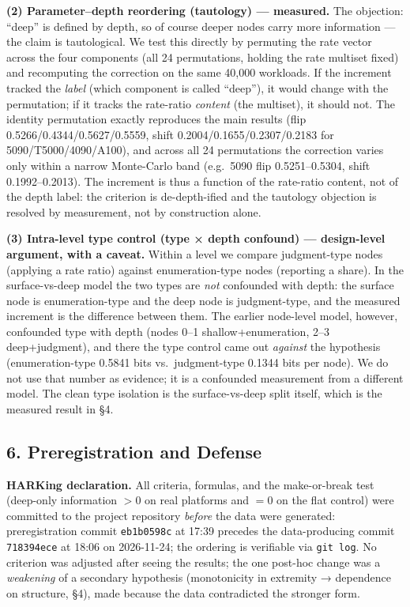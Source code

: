 {{{{\textbf{(2) Parameter--depth reordering (tautology) --- measured.} The objection: ``deep'' is defined by depth, so of course deeper nodes carry more information --- the claim is tautological. We test this directly by permuting the rate vector across the four components (all 24 permutations, holding the rate multiset fixed) and recomputing the correction on the same 40,000 workloads. If the increment tracked the \emph{label} (which component is called ``deep''), it would change with the permutation; if it tracks the rate-ratio \emph{content} (the multiset), it should not. The identity permutation exactly reproduces the main results (flip 0.5266/0.4344/0.5627/0.5559, shift 0.2004/0.1655/0.2307/0.2183 for 5090/T5000/4090/A100), and across all 24 permutations the correction varies only within a narrow Monte-Carlo band (e.g.~5090 flip 0.5251--0.5304, shift 0.1992--0.2013). The increment is thus a function of the rate-ratio content, not of the depth label: the criterion is de-depth-ified and the tautology objection is resolved by measurement, not by construction alone.

\textbf{(3) Intra-level type control (type × depth confound) --- design-level argument, with a caveat.} Within a level we compare judgment-type nodes (applying a rate ratio) against enumeration-type nodes (reporting a share). In the surface-vs-deep model the two types are \emph{not} confounded with depth: the surface node is enumeration-type and the deep node is judgment-type, and the measured increment is the difference between them. The earlier node-level model, however, confounded type with depth (nodes 0--1 shallow+enumeration, 2--3 deep+judgment), and there the type control came out \emph{against} the hypothesis (enumeration-type 0.5841 bits vs.~judgment-type 0.1344 bits per node). We do not use that number as evidence; it is a confounded measurement from a different model. The clean type isolation is the surface-vs-deep split itself, which is the measured result in §4.

\subsection{6. Preregistration and Defense}\label{preregistration-and-defense}

\textbf{HARKing declaration.} All criteria, formulas, and the make-or-break test (deep-only information \(> 0\) on real platforms and \(= 0\) on the flat control) were committed to the project repository \emph{before} the data were generated: preregistration commit \texttt{eb1b0598c} at 17:39 precedes the data-producing commit \texttt{718394ece} at 18:06 on 2026-11-24; the ordering is verifiable via \texttt{git\ log}. No criterion was adjusted after seeing the results; the one post-hoc change was a \emph{weakening} of a secondary hypothesis (monotonicity in extremity → dependence on structure, §4), made because the data contradicted the stronger form.

}}}}
